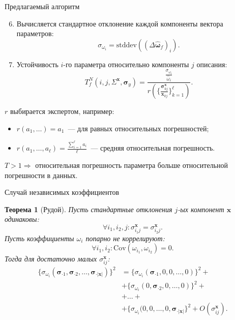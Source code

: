 \documentclass{beamer}
\newtheorem{theo}{Теорема}
\begin{document}
\begin{frame}{Предлагаемый алгоритм}
  \begin{enumerate}
    \setcounter{enumi}{5}
    \item Вычисляется стандартное отклонение каждой компоненты вектора параметров:
      \[
        \sigma_{\omega_i} = \text{stddev} ((\Delta\hat{\boldsymbol{\omega}}_f)_i).
      \]
    \item Устойчивость $i$-го параметра относительно компоненты $j$ описания:
      \[
        T^N_f(i, j, \Sigma^{\mathbf{x}}, \boldsymbol{\sigma}_y) = \frac{\frac{\sigma_{\omega_i}}{\hat{\omega}_i}}{r(\{\frac{\boldsymbol{\sigma}^\mathbf{x}_{k j}}{\mathbf{x}_{k j}}\}_{k = 1}^{\ell})}.
      \]
  \end{enumerate}
  
  $r$ выбирается экспертом, например:
  \begin{itemize}
    \item $r(a_1, \dots) = a_1$~--- для равных относительных погрешностей;
    \item $r(a_1, \dots, a_{\ell}) = \frac{\sum_{i = 1}^{\ell} a_i}{\ell}$~--- средняя относительная погрешность.
  \end{itemize}
  
  $T > 1 \Rightarrow$ относительная погрешность параметра больше относительной
  погрешности в данных.
\end{frame}

\begin{frame}{Случай независимых коэффициентов}
  \begin{theo}[Рудой]
    Пусть стандартные отклонения $j$-ых компонент $\mathbf{x}$ одинаковы:
    \[
      \forall i_1, i_2, j: \sigma_{i_1 j}^{\mathbf{x}} = \sigma_{i_2 j}^{\mathbf{x}}.
    \]
    Пусть коэффициенты $\omega_i$ попарно не коррелируют:
    \[
      \forall i_1, i_2: \text{Cov} (\omega_{i_1}, \omega_{i_2}) = 0.
    \]
    Тогда для достаточно малых $\sigma_{ij}^\mathbf{x}$:
    \begin{align*}
      \{ \sigma_{\omega_i} (\boldsymbol{\sigma}_{\cdot 1}, \boldsymbol{\sigma}_{\cdot 2}, \dots, \boldsymbol{\sigma}_{\cdot |\mathbf{x}|}) \}^2 &=
        \{ \sigma_{\omega_i} (\boldsymbol{\sigma}_{\cdot 1}, 0, 0, \dots, 0) \}^2 + \nonumber \\
        & + \{ \sigma_{\omega_i} (0, \boldsymbol{\sigma}_{\cdot 2}, 0, \dots, 0) \}^2 + \nonumber \\
        & + \dots + \nonumber \\
        & + \{ \sigma_{\omega_i} (0, 0, \dots, 0, \boldsymbol{\sigma}_{\cdot |\mathbf{x}|} \}^2 + O(\sigma_{ij}^{\boldsymbol{x}}).
      \label{eq:pypha_variance}
    \end{align*}
  \end{theo}
\end{frame}
\end{document}
